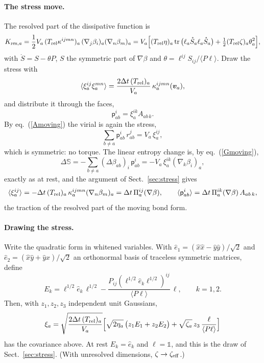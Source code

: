 \documentclass[11pt,aps,preprint,nofootinbib,superscriptaddress,tightenlines]{revtex4-2}
\def\st{\begin{equation}}
\def\stp{\end{equation}}
\def\Eq#1{eq.~(\ref{#1})}
\def\Sect#1{Sect.~\ref{#1}}
\newcommand{\one}{\mathds{1}}
\DeclareMathOperator{\tr}{tr}
\newcommand{\avg}[1]{\langle #1\rangle}
\let\oldparagraph\paragraph
\renewcommand{\paragraph}{\par\bigskip\oldparagraph}
\begin{document}
\paragraph{The stress move.}  The resolved part of the dissipative function is
\st
K_{{\rm res},a}=\frac12V_a\,(T_{\rm rel}\kappa^{ijmn})_a\,(\nabla_j\beta_i)_a(\nabla_n\beta_m)_a
=V_a\Big[(T_{\rm rel}\eta)_a\tr\big(\ell_a\mathring S_a\ell_a\mathring S_a\big)+\tfrac12(T_{\rm rel}\zeta)_a\theta_a^2\Big],
\stp
with $\mathring S=S-\theta P$, $S$ the symmetric part of $\nabla\beta$ and
$\theta=\ell^{ij}S_{ij}/\avg{P\ell}$.  Draw the stress with
\st
\avg{\xi_a^{ij}\xi_a^{mn}}=\frac{2\Delta t\,(T_{\rm rel})_a}{V_a}\,\kappa_a^{ijmn}(\bm v_a),
\stp
and distribute it through the faces,
\st
\mathsf p^i_{ab}=\xi_a^{ik}A_{ab\,k} .
\stp
By \Eq{Amoving} the virial is again the stress,
\st
\sum_{b\neq a}\mathsf p^i_{ab}\,r^j_{ab}=V_a\,\xi_a^{ij} ,
\stp
which is symmetric: no torque.  The linear entropy change is, by \Eq{Gmoving},
\st
\Delta\mathbb S=-\sum_{b\neq a}(\Delta\beta_{ab})_i\,\mathsf p^i_{ab}=-V_a\,\xi_a^{ik}(\nabla_k\beta_i)_a,
\stp
exactly as at rest, and the argument of \Sect{sec:stress} gives
\st
\avg{\xi_a^{ij}}=-\Delta t\,(T_{\rm rel})_a\,\kappa_a^{ijmn}(\nabla_n\beta_m)_a=\Delta t\,\Pi_a^{ij}(\nabla\beta),\qquad
\avg{\mathsf p^i_{ab}}=\Delta t\,\Pi_a^{ik}(\nabla\beta)\,A_{ab\,k} ,
\stp
the traction of the resolved part of the moving bond form.

\paragraph{Drawing the stress.}  Write the quadratic form in whitened
variables.  With $\hat e_1=(\hat x\hat x-\hat y\hat y)/\sqrt2$ and
$\hat e_2=(\hat x\hat y+\hat y\hat x)/\sqrt2$ an orthonormal basis of traceless
symmetric matrices, define
\st
E_k=\ell^{1/2}\hat e_k\,\ell^{1/2}-\frac{P_{ij}(\ell^{1/2}\hat e_k\ell^{1/2})^{ij}}{\avg{P\ell}}\,\ell ,
\qquad k=1,2 .
\stp
Then, with $z_1,z_2,z_3$ independent unit Gaussians,
\st
\xi_a=\sqrt{\frac{2\Delta t\,(T_{\rm rel})_a}{V_a}}\Big[\sqrt{2\eta_a}\,\big(z_1E_1+z_2E_2\big)
+\sqrt{\zeta_a}\,z_3\,\frac{\ell}{\avg{P\ell}}\Big]
\stp
has the covariance above.  At rest $E_k=\hat e_k$ and $\ell=\one$, and this is the
draw of \Sect{sec:stress}.  (With unresolved dimensions, $\zeta\to\zeta_{\rm eff}$.)
\end{document}

